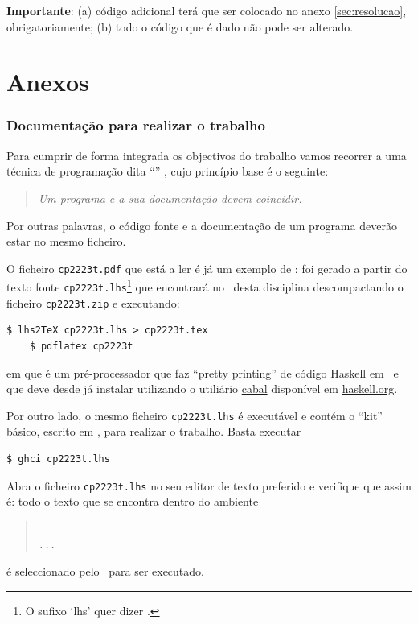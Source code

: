 \documentclass[a4paper]{article}
\begin{document}
\begin{alert}
\textbf{Importante}: (a) código adicional terá que ser colocado no anexo
\ref{sec:resolucao}, obrigatoriamente; (b) todo o código que é dado não pode
ser alterado.
\end{alert}

\part*{Anexos}

\appendix

\section{Documentação para realizar o trabalho}
\label{sec:documentacao}
Para cumprir de forma integrada os objectivos do trabalho vamos recorrer
a uma técnica de programa\-ção dita
``'' \cite{Kn92}, cujo princípio base é o seguinte:
%
\begin{quote}\em Um programa e a sua documentação devem coincidir.
\end{quote}
%
Por outras palavras, o código fonte e a documentação de um
programa deverão estar no mesmo ficheiro.

O ficheiro \texttt{cp2223t.pdf} que está a ler é já um exemplo de
: foi gerado a partir do texto fonte
\texttt{cp2223t.lhs}\footnote{O sufixo `lhs' quer dizer
\emph{}.} que encontrará no
\MaterialPedagogico\ desta disciplina descompactando o ficheiro
\texttt{cp2223t.zip} e executando:
\begin{Verbatim}[fontsize=\small]
    $ lhs2TeX cp2223t.lhs > cp2223t.tex
    $ pdflatex cp2223t
\end{Verbatim}
em que \href{https://hackage.haskell.org/package/lhs2tex}{\texttt\LhsToTeX} é
um pré-processador que faz ``pretty printing''
de código Haskell em \Latex\ e que deve desde já instalar utilizando o
utiliário \href{https://www.haskell.org/cabal/}{cabal} disponível em \href{https://www.haskell.org}{haskell.org}.

Por outro lado, o mesmo ficheiro \texttt{cp2223t.lhs} é executável e contém
o ``kit'' básico, escrito em \Haskell, para realizar o trabalho. Basta executar
\begin{Verbatim}[fontsize=\small]
    $ ghci cp2223t.lhs
\end{Verbatim}

\noindent Abra o ficheiro \texttt{cp2223t.lhs} no seu editor de texto preferido
e verifique que assim é: todo o texto que se encontra dentro do ambiente
\begin{quote}\small\tt
{}
\\ ... \\
\end{quote}
é seleccionado pelo \GHCi\ para ser executado.
\end{document}
